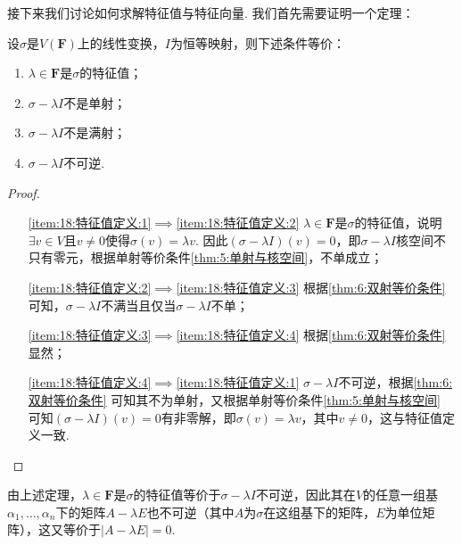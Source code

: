 接下来我们讨论如何求解特征值与特征向量. 我们首先需要证明一个定理：
\begin{theorem}
    设$\sigma$是$V(\mathbf{F})$上的线性变换，$I$为恒等映射，则下述条件等价：
    \begin{enumerate}[label=(\arabic*)]
        \item \label{item:18:特征值定义:1}
              $\lambda\in\mathbf{F}$是$\sigma$的特征值；

        \item \label{item:18:特征值定义:2}
              $\sigma-\lambda I$不是单射；

        \item \label{item:18:特征值定义:3}
              $\sigma-\lambda I$不是满射；

        \item \label{item:18:特征值定义:4}
              $\sigma-\lambda I$不可逆.
    \end{enumerate}
\end{theorem}

\begin{proof}
    \begin{itemize}
        \item[\ref*{item:18:特征值定义:1}$\implies$\ref*{item:18:特征值定义:2}] $\lambda\in\mathbf{F}$是$\sigma$的特征值，说明$\exists v\in V$且$v\neq 0$使得$\sigma(v)=\lambda v$. 因此$(\sigma-\lambda I)(v)=0$，即$\sigma-\lambda I$核空间不只有零元，根据单射等价条件\autoref{thm:5:单射与核空间}，不单成立；

        \item[\ref*{item:18:特征值定义:2}$\implies$\ref*{item:18:特征值定义:3}] 根据\autoref{thm:6:双射等价条件} 可知，$\sigma-\lambda I$不满当且仅当$\sigma-\lambda I$不单；

        \item[\ref*{item:18:特征值定义:3}$\implies$\ref*{item:18:特征值定义:4}] 根据\autoref*{thm:6:双射等价条件} 显然；

        \item[\ref*{item:18:特征值定义:4}$\implies$\ref*{item:18:特征值定义:1}] $\sigma-\lambda I$不可逆，根据\autoref*{thm:6:双射等价条件} 可知其不为单射，又根据单射等价条件\autoref*{thm:5:单射与核空间} 可知$(\sigma-\lambda I)(v)=0$有非零解，即$\sigma(v)=\lambda v$，其中$v\neq 0$，这与特征值定义一致.
    \end{itemize}
\end{proof}

由上述定理，$\lambda\in\mathbf{F}$是$\sigma$的特征值等价于$\sigma-\lambda I$不可逆，因此其在$V$的任意一组基$\alpha_1,\ldots,\alpha_n$下的矩阵$A-\lambda E$也不可逆（其中$A$为$\sigma$在这组基下的矩阵，$E$为单位矩阵），这又等价于$|A-\lambda E|=0$.

